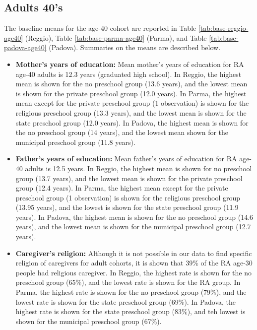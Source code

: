 \documentclass[12pt]{article}
\begin{document}
\subsection{Adults 40's}

The baseline means for the age-40 cohort are reported in Table \ref{tab:base-reggio-age40} (Reggio), Table \ref{tab:base-parma-age40} (Parma), and Table \ref{tab:base-padova-age40} (Padova). Summaries on the means are described below.

\begin{itemize}
\item \textbf{Mother's years of education:} Mean mother's years of education for RA age-40 adults is 12.3 years (graduated high school). In Reggio, the highest mean is shown for the no preschool group (13.6 years), and the lowest mean is shown for the private preschool group (12.0 years). In Parma, the highest mean except for the private preschool group (1 observation) is shown for the religious preschool group (13.3 years), and the lowest mean is shown for the state preschool group (12.0 years). In Padova, the highest mean is shown for the no preschool group (14 years), and the lowest mean shown for the municipal preschool group (11.8 years).

\item \textbf{Father's years of education:} Mean father's years of education for RA age-40 adults is 12.5 years. In Reggio, the highest mean is shown for no preschool group (13.7 years), and the lowest mean is shown for the private preschool group (12.4 years). In Parma, the highest mean except for the private preschool group (1 observation) is shown for the religious preschool group (13.95 years), and the lowest is shown for the state preschool group (11.9 years). In Padova, the highest mean is shown for the no preschool group (14.6 years), and the lowest mean is shown for the municipal preschool group (12.7 years).

\item \textbf{Caregiver's religion:} Although it is not possible in our data to find specific religion of caregivers for adult cohorts, it is shown that 39\% of the RA age-30 people had religious caregiver. In Reggio, the highest rate is shown for the no preschool group (65\%), and the lowest rate is shown for the RA group. In Parma, the highest rate is shown for the no preschool group (79\%), and the lowest rate is shown for the state preschool group (69\%). In Padova, the highest rate is shown for the state preschool group (83\%), and teh lowest is shown for the municipal preschool group (67\%). 

\end{itemize}
\end{document}
